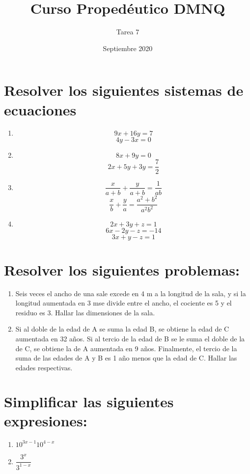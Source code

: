 \documentclass{article}
\title{Curso Propedéutico DMNQ}
\author{Tarea 7}
\date{Septiembre 2020}
\begin{document}
\maketitle

\section*{Resolver los siguientes sistemas de ecuaciones}

\begin{enumerate}
    \item $$9x + 16y = 7$$
$$4y - 3x = 0$$

\item $$8x + 9y = 0$$
$$2x + 5y + 3y = \frac{7}{2}$$

\item $$\dfrac{x}{a+b}+\dfrac{y}{a+b}=\dfrac{1}{ab}$$
$$\dfrac{x}{b}+\dfrac{y}{a}=\dfrac{a^2+b^2}{a^2b^2}$$

\item $$2x + 3y + z = 1$$
$$6x - 2y - z = -14$$
$$3x + y - z = 1$$

\end{enumerate}


\section*{Resolver los siguientes problemas:}

\begin{enumerate}
    \item Seis veces el ancho de una sale excede en 4 m a la longitud de la sala, y si la longitud
aumentada en 3 mse divide entre el ancho, el cociente es 5 y el residuo es 3. Hallar las dimensiones de la sala.
    \item Si al doble de la edad de A se suma la edad B, se obtiene la edad de C aumentada en 32 años. Si al tercio de la edad de B se le suma el doble de la de C, se obtiene la de A aumentada en 9 años. Finalmente, el tercio de la suma de las edades de A y B es 1 año menos que la edad de C. Hallar las edades respectivas.
\end{enumerate}

\section*{Simplificar las siguientes expresiones:}

\begin{enumerate}
    \item $10^{3x-1}10^{4-x}$
    \item $\dfrac{3^x}{3^{1-x}}$
\end{enumerate}
\end{document}
